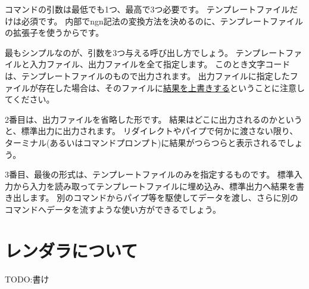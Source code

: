 \documentclass[a4j]{jsarticle}
\begin{document}
コマンドの引数は最低でも1つ、最高で3つ必要です。
テンプレートファイルだけは必須です。
内部でngn記法の変換方法を決めるのに、テンプレートファイルの拡張子を使うからです。

最もシンプルなのが、引数を3つ与える呼び出し方でしょう。
テンプレートファイルと入力ファイル、出力ファイルを全て指定します。
このとき文字コードは、テンプレートファイルのもので出力されます。
出力ファイルに指定したファイルが存在した場合は、そのファイルに\underline{結果を上書きする}ということに注意してください。

2番目は、出力ファイルを省略した形です。
結果はどこに出力されるのかというと、標準出力に出力されます。
リダイレクトやパイプで何かに渡さない限り、ターミナル(あるいはコマンドプロンプト)に結果がつらつらと表示されるでしょう。

3番目、最後の形式は、テンプレートファイルのみを指定するものです。
標準入力から入力を読み取ってテンプレートファイルに埋め込み、標準出力へ結果を書き出します。
別のコマンドからパイプ等を駆使してデータを渡し、さらに別のコマンドへデータを流すような使い方ができるでしょう。


\section{レンダラについて}
\label{sec:renderer}

TODO:書け
\end{document}
